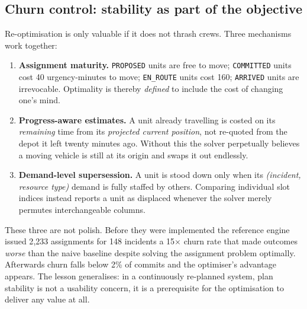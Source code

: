 \begin{decbox}
\end{decbox}

\subsection{Churn control: stability as part of the objective}

Re-optimisation is only valuable if it does not thrash crews. Three mechanisms
work together:

\begin{enumerate}
\item \textbf{Assignment maturity.} \texttt{PROPOSED} units are free to move;
      \texttt{COMMITTED} units cost 40 urgency-minutes to move;
      \texttt{EN\_ROUTE} units cost 160; \texttt{ARRIVED} units are
      irrevocable. Optimality is thereby \emph{defined} to include the cost of
      changing one's mind.
\item \textbf{Progress-aware estimates.} A unit already travelling is costed on
      its \emph{remaining} time from its \emph{projected current position}, not
      re-quoted from the depot it left twenty minutes ago. Without this the
      solver perpetually believes a moving vehicle is still at its origin and
      swaps it out endlessly.
\item \textbf{Demand-level supersession.} A unit is stood down only when its
      \emph{(incident, resource type)} demand is fully staffed by others.
      Comparing individual slot indices instead reports a unit as displaced
      whenever the solver merely permutes interchangeable columns.
\end{enumerate}

\begin{keybox}
These three are not polish. Before they were implemented the reference
engine issued 2{,}233 assignments for 148 incidents \textemdash{} a
15$\times$ churn rate that made outcomes \emph{worse} than the naive
baseline despite solving the assignment problem optimally. Afterwards churn
falls below 2\% of commits and the optimiser's advantage appears. The lesson
generalises: in a continuously re-planned system, plan stability is not a
usability concern, it is a prerequisite for the optimisation to deliver any
value at all.
\end{keybox}


